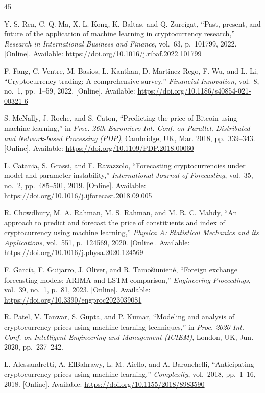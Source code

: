 \documentclass[conference]{IEEEtran}
\begin{document}
\begin{thebibliography}{45}

Y.-S. Ren, C.-Q. Ma, X.-L. Kong, K. Baltas, and Q. Zureigat, ``Past, present, and future of the application of machine learning in cryptocurrency research,'' \textit{Research in International Business and Finance}, vol.~63, p.~101799, 2022. [Online]. Available: \url{https://doi.org/10.1016/j.ribaf.2022.101799}

F. Fang, C. Ventre, M. Basios, L. Kanthan, D. Martinez-Rego, F. Wu, and L. Li, ``Cryptocurrency trading: A comprehensive survey,'' \textit{Financial Innovation}, vol.~8, no.~1, pp.~1--59, 2022. [Online]. Available: \url{https://doi.org/10.1186/s40854-021-00321-6}

S. McNally, J. Roche, and S. Caton, ``Predicting the price of Bitcoin using machine learning,'' in \textit{Proc. 26th Euromicro Int. Conf. on Parallel, Distributed and Network-based Processing (PDP)}, Cambridge, UK, Mar. 2018, pp.~339--343. [Online]. Available: \url{https://doi.org/10.1109/PDP.2018.00060}

L. Catania, S. Grassi, and F. Ravazzolo, ``Forecasting cryptocurrencies under model and parameter instability,'' \textit{International Journal of Forecasting}, vol.~35, no.~2, pp.~485--501, 2019. [Online]. Available: \url{https://doi.org/10.1016/j.ijforecast.2018.09.005}

R. Chowdhury, M. A. Rahman, M. S. Rahman, and M. R. C. Mahdy, ``An approach to predict and forecast the price of constituents and index of cryptocurrency using machine learning,'' \textit{Physica A: Statistical Mechanics and its Applications}, vol.~551, p.~124569, 2020. [Online]. Available: \url{https://doi.org/10.1016/j.physa.2020.124569}

F. Garc\'{i}a, F. Guijarro, J. Oliver, and R. Tamo\v{s}i\={u}nien\'{e}, ``Foreign exchange forecasting models: ARIMA and LSTM comparison,'' \textit{Engineering Proceedings}, vol.~39, no.~1, p.~81, 2023. [Online]. Available: \url{https://doi.org/10.3390/engproc2023039081}

R. Patel, V. Tanwar, S. Gupta, and P. Kumar, ``Modeling and analysis of cryptocurrency prices using machine learning techniques,'' in \textit{Proc. 2020 Int. Conf. on Intelligent Engineering and Management (ICIEM)}, London, UK, Jun. 2020, pp.~237--242.

L. Alessandretti, A. ElBahrawy, L. M. Aiello, and A. Baronchelli, ``Anticipating cryptocurrency prices using machine learning,'' \textit{Complexity}, vol.~2018, pp.~1--16, 2018. [Online]. Available: \url{https://doi.org/10.1155/2018/8983590}


\end{thebibliography}
\end{document}

